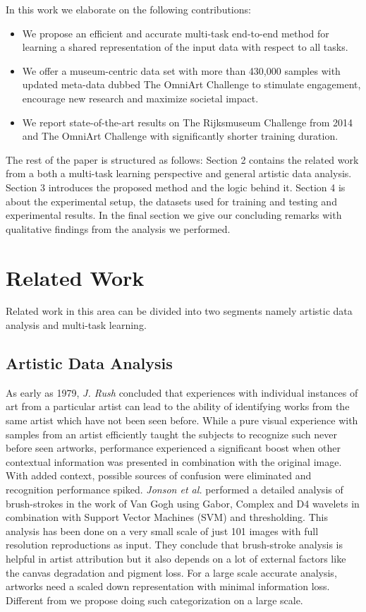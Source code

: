\documentclass[sigconf]{acmart}
\begin{document}
In this work we elaborate on the following contributions:

\begin{itemize}
  \item We propose an efficient and accurate multi-task end-to-end method for learning a shared representation of the input data with respect to all tasks.
  \item We offer a museum-centric data set with more than 430,000 samples with updated meta-data dubbed The OmniArt Challenge to stimulate engagement, encourage new research and maximize societal impact.   
  \item We report state-of-the-art results on The Rijksmuseum Challenge from 2014 and The OmniArt Challenge with significantly shorter training duration.
\end{itemize}

The rest of the paper is structured as follows: Section 2 contains the related work from a both a multi-task learning perspective and general artistic data analysis. Section 3 introduces the proposed method and the logic behind it. Section 4 is about the experimental setup, the datasets used for training and testing and experimental results. In the final section we give our concluding remarks with qualitative findings from the analysis we performed.

\section{Related Work}
Related work in this area can be divided into two segments namely artistic data analysis and multi-task learning.

\subsection{Artistic Data Analysis}

As early as 1979, \textit{J. Rush}\cite{rush1979acquiring} concluded that experiences with individual instances of art from a particular artist can lead to the ability of identifying works from the same artist which have not been seen before. While a pure visual experience with samples from an artist efficiently taught the subjects to recognize such never before seen artworks, performance experienced a significant boost when other contextual information was presented in combination with the original image. With added context, possible sources of confusion were eliminated and recognition performance spiked. \textit{Jonson et al.}\cite{johnson2008image} performed a detailed analysis of brush-strokes in the work of Van Gogh using Gabor, Complex and D4 wavelets in combination with Support Vector Machines (SVM) and thresholding. This analysis has been done on a very small scale of just 101 images with full resolution reproductions as input. They conclude that brush-stroke analysis is helpful in artist attribution but it also depends on a lot of external factors like the canvas degradation and pigment loss. For a large scale accurate analysis, artworks need a scaled down representation with minimal information loss. Different from \cite{rush1979acquiring, johnson2008image} we propose doing such categorization on a large scale.
\end{document}
